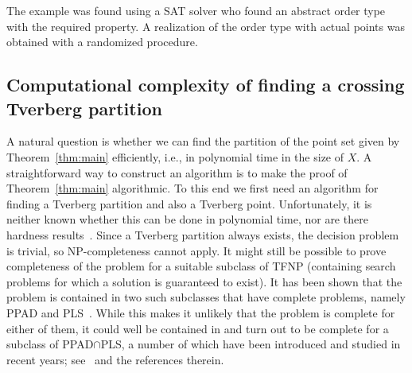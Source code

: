 \documentclass[english,a4paper,nolineno]{lipics-v2019}
\begin{document}
{%
The example was found using a SAT solver who found an abstract order type with the required property. A realization of the order type with actual points was obtained with a randomized procedure.

\subsection{Computational complexity of finding a crossing Tverberg partition}
A natural question is whether we can find the partition of the point set given by Theorem~\ref{thm:main} efficiently, i.e.,  in polynomial time in the size of $X$. 
A straightforward way to construct an algorithm is to  make the proof of Theorem~\ref{thm:main} algorithmic.
To this end we first need an algorithm for finding a Tverberg partition and also a Tverberg point. Unfortunately, it is neither known whether this can be done in polynomial time, nor are there hardness results~\cite[Section 3.4]{TverbergComplexity18}. Since a Tverberg partition always exists, the decision problem is trivial, so NP-completeness cannot apply. It might still be possible to prove completeness of the problem for a suitable subclass of TFNP (containing search problems for which a solution is guaranteed to exist). It has been shown that the problem is contained in two such subclasses that have complete problems, namely PPAD and PLS~\cite[Theorem 4.9]{MMSS17_endofline}. While this makes it unlikely that the problem is complete for either of them, it could well be contained in and turn out to be complete for a subclass of PPAD$\cap$PLS, a number of which have been introduced and studied in recent years; see~\cite{DBLP:journals/corr/abs-1811-03841} and the references therein.


}
\end{document}
